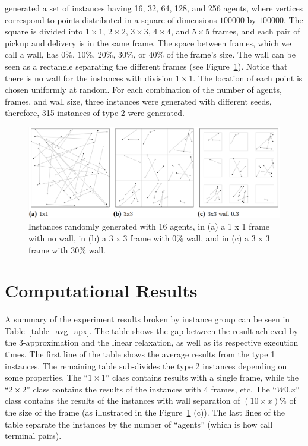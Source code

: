 \cite{Pereira2018TheSM} generated a set of instances having 16, 32, 64, 128, and 256 agents, where vertices correspond to points distributed in a square of dimensions \(100000\) by \(100000\). The square is divided into \(1 \times 1\), \(2 \times 2\), \(3 \times 3\), \(4 \times 4\), and \(5 \times 5\) frames, and each pair of pickup and delivery is in the same frame. The space between frames, which we call a wall, has \(0\%\), \(10\%\), \(20\%\), \(30\%\), or \(40\%\) of the frame’s size. The wall can be seen as a rectangle separating the different frames (see Figure~\ref{fig:instances_type_2}). Notice that there is no wall for the instances with division \(1 \times 1\). The location of each point is chosen uniformly at random. For each combination of the number of agents, frames, and wall size, three instances were generated with different seeds, therefore, 315 instances of type 2 were generated.

\begin{figure}[H]
    \centering
    \includegraphics[scale=0.5]{imgs/instances_type_2.png}
    \caption{Instances randomly generated with 16 agents, in (a) a 1 x 1 frame with no wall, in (b) a 3 x 3 frame with \(0\%\) wall, and in (c) a 3 x 3 frame with \(30\%\) wall.}
    \label{fig:instances_type_2}
\end{figure}

\section{Computational Results}

A summary of the experiment results broken by instance group can be seen in Table~\ref{table_avg_apx}. The table shows the gap between the result achieved by the 3-approximation and the linear relaxation, as well as its respective execution times. The first line of the table shows the average results from the type 1 instances. The remaining table sub-divides the type 2 instances depending on some properties. The ``\(1 \times 1\)'' class contains results with a single frame, while the ``\(2 \times 2\)'' class contains the results of the instances with 4 frames, etc. The ``\(W0.x\)'' class contains the results of the instances with wall separation of \((10 \times x)\%\) of the size of the frame (as illustrated in the Figure~\ref{fig:instances_type_2} (c)). The last lines of the table separate the instances by the number of ``agents'' (which is how \citeauthor{Pereira2018TheSM} call terminal pairs).

